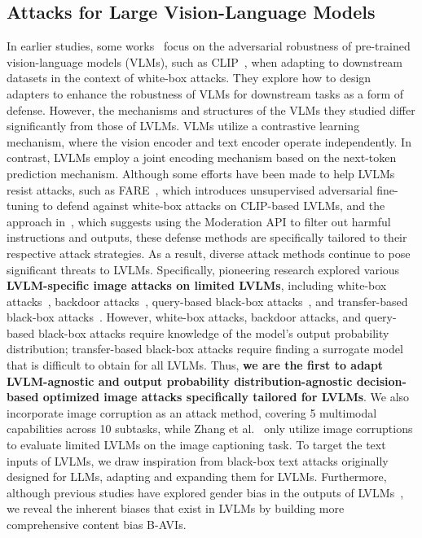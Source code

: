 \subsection{Attacks for Large Vision-Language Models}
\label{2-3}
In earlier studies, some works~\cite{chen2024benchmarking, li2024one} focus on the adversarial robustness of pre-trained vision-language models (VLMs), such as CLIP~\cite{radford2021learning}, when adapting to downstream datasets in the context of white-box attacks. They explore how to design adapters to enhance the robustness of VLMs for downstream tasks as a form of defense. However, the mechanisms and structures of the VLMs they studied differ significantly from those of LVLMs. VLMs utilize a contrastive learning mechanism, where the vision encoder and text encoder operate independently. In contrast, LVLMs employ a joint encoding mechanism based on the next-token prediction mechanism.
Although some efforts have been made to help LVLMs resist attacks, such as FARE~\cite{schlarmannrobust}, which introduces unsupervised adversarial fine-tuning to defend against white-box attacks on CLIP-based LVLMs, and the approach in~\cite{qi2023visual}, which suggests using the Moderation API to filter out harmful instructions and outputs, these defense methods are specifically tailored to their respective attack strategies. As a result, diverse attack methods continue to pose significant threats to LVLMs.
Specifically, pioneering research explored various \textbf{LVLM-specific image attacks on limited LVLMs}, including white-box attacks~\cite{schlarmann2023adversarial, qi2023visual,baileyimage,cui2024robustness, tu2023many}, backdoor attacks~\cite{lu2024test}, query-based black-box attacks~\cite{zhao2024evaluating}, and transfer-based black-box attacks~\cite{dong2023robust}.
However, white-box attacks, backdoor attacks, and query-based black-box attacks require knowledge of the model's output probability distribution; transfer-based black-box attacks require finding a surrogate model that is difficult to obtain for all LVLMs.
Thus, \textbf{we are the first to adapt LVLM-agnostic and output probability distribution-agnostic decision-based optimized image attacks specifically tailored for LVLMs}. We also incorporate image corruption as an attack method, covering 5 multimodal capabilities across 10 subtasks, while Zhang et al.~\cite{zhang2024benchmarking} only utilize image corruptions to evaluate limited LVLMs on the image captioning task. 
To target the text inputs of LVLMs, we draw inspiration from black-box text attacks originally designed for LLMs\cite{zhu2023promptbench}, adapting and expanding them for LVLMs. Furthermore, although previous studies have explored gender bias in the outputs of LVLMs~\cite{chuang2023debiasing, hall2023vision}, we reveal the inherent biases that exist in LVLMs by building more comprehensive content bias B-AVIs.

